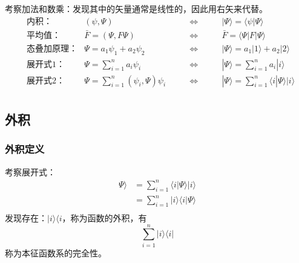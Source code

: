 \begin{frame}
    \frametitle{}
    考察加法和数乘：发现其中的矢量通常是线性的，因此用右矢来代替。\\
    $$\begin{aligned}
    &\text{内积：}   & (\psi,\Psi)  & \qquad\Leftrightarrow \qquad & | \Psi \rangle =\langle \psi | \Psi \rangle \\
    &\text{平均值：}   & \bar{F}=(\Psi,F\Psi)  & \qquad\Leftrightarrow \qquad & \bar{F} =\langle \Psi|F | \Psi \rangle \\
    &\text{态叠加原理：}   & \Psi=a_1 \psi_1+ a_2 \psi_2  & \qquad\Leftrightarrow \qquad &| \Psi \rangle =a_1 |1 \rangle+ a_2 |2 \rangle\\
    &\text{展开式1：}     & \Psi=\sum\limits_{i=1} ^n a_i \psi_i & \qquad \Leftrightarrow \qquad &| \Psi \rangle =\sum\limits_{i=1} ^n a_i |i \rangle\\
    &\text{展开式2：}     & \Psi=\sum\limits_{i=1} ^n (\psi_i ,\Psi) \psi_i & \qquad \Leftrightarrow \qquad &| \Psi \rangle =\sum\limits_{i=1} ^n \langle i | \Psi \rangle |i\rangle\\
    \end{aligned}
    $$
\end{frame} 
 
\subsection{外积}

\begin{frame}
    \frametitle{外积定义}
    考察展开式：
    $$\begin{aligned}
    \Psi \rangle &= \sum\limits_{i=1} ^n \langle i | \Psi \rangle |i\rangle\\
                 &= \sum\limits_{i=1} ^n |i\rangle\langle i | \Psi \rangle \\
    \end{aligned}
    $$
    发现存在：$|i\rangle\langle i$，称为函数的外积，有
    \[\sum\limits_{i=1} ^n |i\rangle\langle i |\]
    称为本征函数系的完全性。
\end{frame} 

